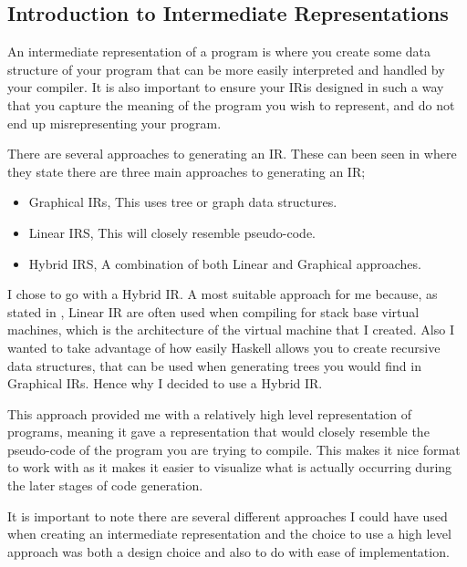 \subsection{Introduction to Intermediate Representations}

An intermediate representation of a program is where you create some data structure of your program that can be more easily interpreted and handled by your compiler. It is also important to ensure your IR\footnotemark[1] is designed in such a way that you capture the meaning of the program you wish to represent, and do not end up misrepresenting your program.


There are several approaches to generating an IR. These can been seen in \cite[p.~223]{EngComp2012} where they state there are three main approaches to generating an IR; 

\begin{itemize}
\item Graphical IRs, This uses tree or graph data structures.  
\item Linear IRS, This will closely resemble pseudo-code. 
\item Hybrid IRS, A combination of both Linear and Graphical approaches.
\end{itemize}

I chose to go with a Hybrid IR. A most suitable approach for me because, as stated in \cite[p.~113]{CompDes2005}, Linear IR are often used when compiling for stack base virtual machines, which is the architecture of the virtual machine that I created. Also I wanted to take advantage of how easily Haskell allows you to create recursive data structures, that can be used when generating trees you would find in Graphical IRs. Hence why I decided to use a Hybrid IR.  

This approach provided me with a relatively high level representation of programs, meaning it gave a representation that would closely resemble the pseudo-code of the program you are trying to compile. This makes it nice format to work with as it makes it easier to visualize what is actually occurring during the later stages of code generation. 

It is important to note there are several different approaches I could have used when creating an intermediate representation and the choice to use a high level approach was both a design choice and also to do with ease of implementation. 

